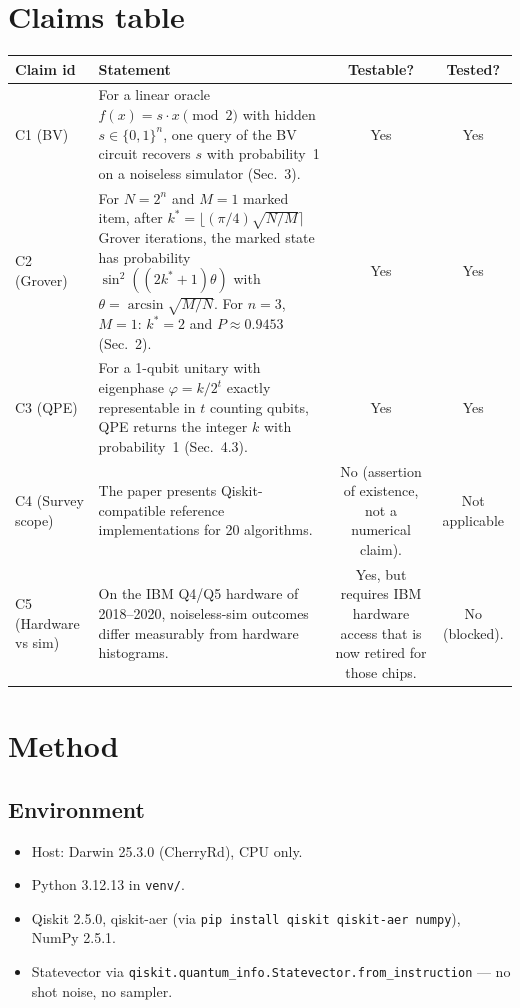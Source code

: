 \documentclass[11pt]{article}
\begin{document}
\section{Claims table}
\label{sec:claims}
\begin{longtable}{@{}p{2.6cm}p{6.4cm}cc@{}}
\toprule
Claim id & Statement & Testable? & Tested? \\
\midrule
C1 (BV) & For a linear oracle $f(x)=s\cdot x \pmod 2$ with hidden
$s\in\{0,1\}^n$, one query of the BV circuit recovers $s$ with
probability~1 on a noiseless simulator (Sec.~3). & Yes & Yes \\
C2 (Grover) & For $N=2^n$ and $M=1$ marked item, after
$k^*=\lfloor(\pi/4)\sqrt{N/M}\rceil$ Grover iterations, the marked
state has probability $\sin^2((2k^*+1)\theta)$ with
$\theta=\arcsin\sqrt{M/N}$. For $n=3$, $M=1$: $k^*=2$ and
$P\approx0.9453$ (Sec.~2). & Yes & Yes \\
C3 (QPE) & For a 1-qubit unitary with eigenphase $\varphi=k/2^t$
exactly representable in $t$ counting qubits, QPE returns the
integer $k$ with probability~1 (Sec.~4.3). & Yes & Yes \\
C4 (Survey scope) & The paper presents Qiskit-compatible
reference implementations for 20 algorithms. & No (assertion of
existence, not a numerical claim). & Not applicable \\
C5 (Hardware vs sim) & On the IBM Q4/Q5 hardware of 2018--2020,
noiseless-sim outcomes differ measurably from hardware
histograms. & Yes, but requires IBM hardware access that is now
retired for those chips. & No (blocked). \\
\bottomrule
\end{longtable}

\section{Method}
\label{sec:method}
\subsection{Environment}
\begin{itemize}
\item Host: Darwin 25.3.0 (CherryRd), CPU only.
\item Python 3.12.13 in \texttt{venv/}.
\item Qiskit 2.5.0, qiskit-aer (via \texttt{pip install qiskit qiskit-aer numpy}), NumPy 2.5.1.
\item Statevector via \texttt{qiskit.quantum\_info.Statevector.from\_instruction} --- no shot noise, no sampler.
\end{itemize}
\end{document}
